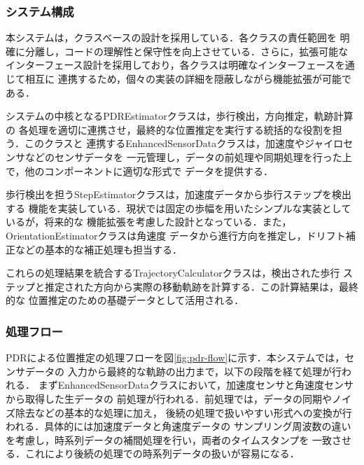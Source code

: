 \subsubsection{システム構成}

本システムは，クラスベースの設計を採用している．各クラスの責任範囲を
明確に分離し，コードの理解性と保守性を向上させている．さらに，拡張可能な
インターフェース設計を採用しており，各クラスは明確なインターフェースを通じて相互に
連携するため，個々の実装の詳細を隠蔽しながら機能拡張が可能である．

システムの中核となるPDREstimatorクラスは，歩行検出，方向推定，軌跡計算の
各処理を適切に連携させ，最終的な位置推定を実行する統括的な役割を担う．このクラスと
連携するEnhancedSensorDataクラスは，加速度やジャイロセンサなどのセンサデータを
一元管理し，データの前処理や同期処理を行った上で，他のコンポーネントに適切な形式で
データを提供する．

歩行検出を担うStepEstimatorクラスは，加速度データから歩行ステップを検出する
機能を実装している．現状では固定の歩幅を用いたシンプルな実装としているが，将来的な
機能拡張を考慮した設計となっている．また，OrientationEstimatorクラスは角速度
データから進行方向を推定し，ドリフト補正などの基本的な補正処理も担当する．

これらの処理結果を統合するTrajectoryCalculatorクラスは，検出された歩行
ステップと推定された方向から実際の移動軌跡を計算する．この計算結果は，最終的な
位置推定のための基礎データとして活用される．

\subsubsection{処理フロー}
PDRによる位置推定の処理フローを図\ref{fig:pdr-flow}に示す．本システムでは，センサデータの
入力から最終的な軌跡の出力まで，以下の段階を経て処理が行われる．
まずEnhancedSensorDataクラスにおいて，加速度センサと角速度センサから取得した生データの
前処理が行われる．前処理では，データの同期やノイズ除去などの基本的な処理に加え，
後続の処理で扱いやすい形式への変換が行われる．具体的には加速度データと角速度データの
サンプリング周波数の違いを考慮し，時系列データの補間処理を行い，両者のタイムスタンプを
一致させる．これにより後続の処理での時系列データの扱いが容易になる．

